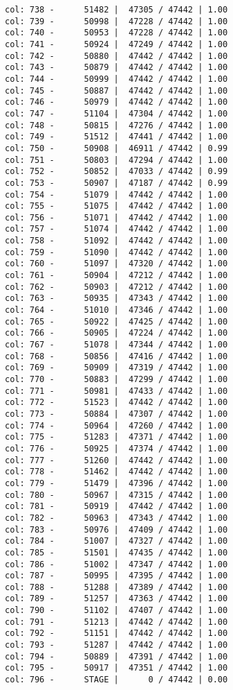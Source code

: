 \documentclass[11pt]{article}
\begin{document}
\begin{Verbatim}[commandchars=\\\{\}]
col: 738 -      51482 |  47305 / 47442 | 1.00
col: 739 -      50998 |  47228 / 47442 | 1.00
col: 740 -      50953 |  47228 / 47442 | 1.00
col: 741 -      50924 |  47249 / 47442 | 1.00
col: 742 -      50880 |  47442 / 47442 | 1.00
col: 743 -      50879 |  47442 / 47442 | 1.00
col: 744 -      50999 |  47442 / 47442 | 1.00
col: 745 -      50887 |  47442 / 47442 | 1.00
col: 746 -      50979 |  47442 / 47442 | 1.00
col: 747 -      51104 |  47304 / 47442 | 1.00
col: 748 -      50815 |  47276 / 47442 | 1.00
col: 749 -      51512 |  47441 / 47442 | 1.00
col: 750 -      50908 |  46911 / 47442 | 0.99
col: 751 -      50803 |  47294 / 47442 | 1.00
col: 752 -      50852 |  47033 / 47442 | 0.99
col: 753 -      50907 |  47187 / 47442 | 0.99
col: 754 -      51079 |  47442 / 47442 | 1.00
col: 755 -      51075 |  47442 / 47442 | 1.00
col: 756 -      51071 |  47442 / 47442 | 1.00
col: 757 -      51074 |  47442 / 47442 | 1.00
col: 758 -      51092 |  47442 / 47442 | 1.00
col: 759 -      51090 |  47442 / 47442 | 1.00
col: 760 -      51097 |  47320 / 47442 | 1.00
col: 761 -      50904 |  47212 / 47442 | 1.00
col: 762 -      50903 |  47212 / 47442 | 1.00
col: 763 -      50935 |  47343 / 47442 | 1.00
col: 764 -      51010 |  47346 / 47442 | 1.00
col: 765 -      50922 |  47425 / 47442 | 1.00
col: 766 -      50905 |  47224 / 47442 | 1.00
col: 767 -      51078 |  47344 / 47442 | 1.00
col: 768 -      50856 |  47416 / 47442 | 1.00
col: 769 -      50909 |  47319 / 47442 | 1.00
col: 770 -      50883 |  47299 / 47442 | 1.00
col: 771 -      50981 |  47433 / 47442 | 1.00
col: 772 -      51523 |  47442 / 47442 | 1.00
col: 773 -      50884 |  47307 / 47442 | 1.00
col: 774 -      50964 |  47260 / 47442 | 1.00
col: 775 -      51283 |  47371 / 47442 | 1.00
col: 776 -      50925 |  47374 / 47442 | 1.00
col: 777 -      51260 |  47442 / 47442 | 1.00
col: 778 -      51462 |  47442 / 47442 | 1.00
col: 779 -      51479 |  47396 / 47442 | 1.00
col: 780 -      50967 |  47315 / 47442 | 1.00
col: 781 -      50919 |  47442 / 47442 | 1.00
col: 782 -      50963 |  47343 / 47442 | 1.00
col: 783 -      50976 |  47409 / 47442 | 1.00
col: 784 -      51007 |  47327 / 47442 | 1.00
col: 785 -      51501 |  47435 / 47442 | 1.00
col: 786 -      51002 |  47347 / 47442 | 1.00
col: 787 -      50995 |  47395 / 47442 | 1.00
col: 788 -      51288 |  47389 / 47442 | 1.00
col: 789 -      51257 |  47363 / 47442 | 1.00
col: 790 -      51102 |  47407 / 47442 | 1.00
col: 791 -      51213 |  47442 / 47442 | 1.00
col: 792 -      51151 |  47442 / 47442 | 1.00
col: 793 -      51287 |  47442 / 47442 | 1.00
col: 794 -      50889 |  47391 / 47442 | 1.00
col: 795 -      50917 |  47351 / 47442 | 1.00
col: 796 -      STAGE |      0 / 47442 | 0.00

    \end{Verbatim}


    
    
    
    
\end{document}
